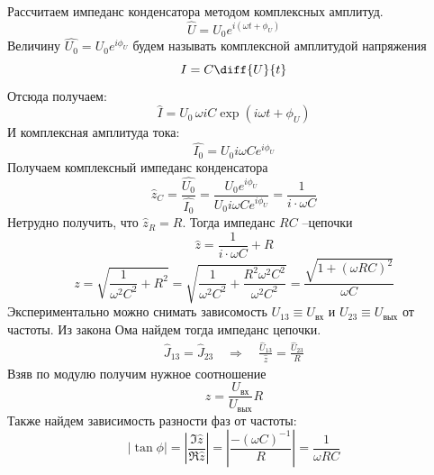 Рассчитаем импеданс конденсатора методом комплексных амплитуд.
\begin{equation}
	\hat{U}=U_0 e^{i(\omega t+\phi_U)}
\end{equation}
Величину $\hat{U_0}=U_0e^{i\phi_U}$ будем называть комплексной амплитудой напряжения
\begin{equation}
	I=C\diff{U}{t}
\end{equation}
Отсюда получаем:
\begin{equation}
	\hat{I}=U_0\,\omega i C\exp(i\omega t+\phi_U)
\end{equation}
И комплексная амплитуда тока:
\begin{equation}
	\hat{I_0}=U_0i\omega C e^{i\phi_U}
\end{equation}
Получаем комплексный импеданс конденсатора
\begin{equation}
	\hat{z}_C=\frac{\hat{U_0}}{\hat{I_0}}=\frac{U_0e^{i\phi_U}}{U_0i\omega C e^{i\phi_U}}=\frac{1}{i\cdot\omega C}
\end{equation}
Нетрудно получить, что $\hat{z}_R=R$. Тогда импеданс $RC$ --цепочки
\begin{equation}
	\hat{z}=\frac{1}{i\cdot\omega C}+R
\end{equation}
\begin{equation}
	z=\sqrt{
		\frac{1}{\omega^2 C^2}	
		+R^2
	}=
	\sqrt{
		\frac{1}{\omega^2 C^2}	
		+\frac{R^2\omega^2 C^2}{\omega^2 C^2}
	}=\frac{\sqrt{1+(\omega RC)^2}}{\omega C}
\end{equation}
Экспериментально можно снимать зависомость $U_{13}\equiv U_\text{вх}$ и $U_{23}\equiv U_\text{вых}$ от частоты. Из закона Ома найдем тогда импеданс цепочки.
\begin{gather}
	\hat{J}_{13}=\hat{J}_{23} \quad\Rightarrow\quad
	\frac{\hat{U}_{13}}{\hat{z}}=\frac{\hat{U}_{23}}{R}
\end{gather}
Взяв по модулю получим нужное соотношение
\begin{equation}
	z=\frac{U_\text{вх}}{U_\text{вых}}R
\end{equation}
Также найдем зависимость разности фаз от частоты:
\begin{equation}
	|\tan\phi| = |\frac{\Im\hat{z}}{\Re\hat{z}}|=
	|\frac{
		-(\omega C)^{-1}
	}{
		R
	}|=
	\frac{
		1
	}{
		\omega RC
	}	
\end{equation}

